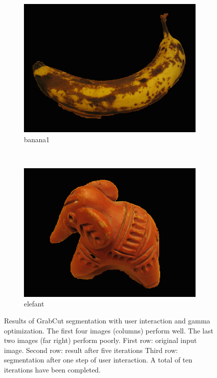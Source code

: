 \documentclass[10pt,twocolumn,letterpaper]{article}
\begin{document}
\begin{figure}[t]
\begin{subfigure}[b]{0.15\textwidth}
                \includegraphics[width=\textwidth]{figures/UI_segmentation/banana1.png}
                \caption{banana1}
        \end{subfigure}%
        ~
        \begin{subfigure}[b]{0.15\textwidth}
                \includegraphics[width=\textwidth]{figures/UI_segmentation/elefant.png}
                \caption{elefant}
        \end{subfigure}%
        
        \caption{Results of GrabCut segmentation with user interaction and gamma optimization. The first four images (columns) perform well. The last two images (far right) perform poorly. First row: original input image. Second row: result after five iterations Third row: segmentation after one step of user interaction. A total of ten iterations have been completed. }\label{fig:good_bad}
\end{figure}
\end{document}
